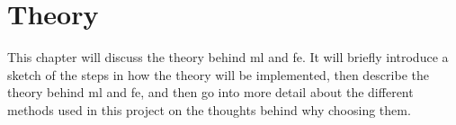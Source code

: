 \chapter{Theory}\label{cha:theory}
This chapter will discuss the theory behind \gls{ml} and \gls{fe}. It will briefly introduce a sketch of the steps in how the theory will be implemented, then describe the theory behind \gls{ml} and \gls{fe}, and then go into more detail about the different methods used in this project on the thoughts behind why choosing them.










